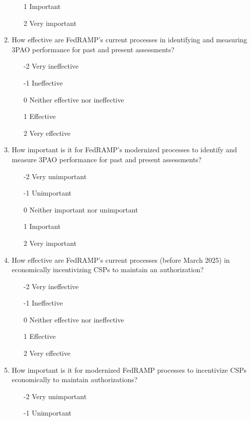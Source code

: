 \documentclass{jdf}
\begin{document}
\begin{enumerate}
\begin{enumerate}
        \item  [1] Important
        \item  [2] Very important
    \end{enumerate}
    \item How effective are FedRAMP's current processes in identifying and measuring 3PAO performance for past and present assessments?
    \begin{enumerate}
        \item [-2] Very ineffective
        \item [-1] Ineffective
        \item  [0] Neither effective nor ineffective
        \item  [1] Effective 
        \item  [2] Very effective
    \end{enumerate}
    \item How important is it for FedRAMP's modernized processes to identify and measure 3PAO performance for past and present assessments?
    \begin{enumerate}
        \item [-2] Very unimportant
        \item [-1] Unimportant
        \item  [0] Neither important nor unimportant
        \item  [1] Important
        \item  [2] Very important
    \end{enumerate}
    \item How effective are FedRAMP's current processes (before March 2025) in economically incentivizing CSPs to maintain an authorization?
    \begin{enumerate}
        \item [-2] Very ineffective
        \item [-1] Ineffective
        \item  [0] Neither effective nor ineffective
        \item  [1] Effective 
        \item  [2] Very effective
    \end{enumerate}
    \item How important is it for modernized FedRAMP processes to incentivize CSPs economically to maintain authorizations?
    \begin{enumerate}
        \item [-2] Very unimportant
        \item [-1] Unimportant

\end{enumerate}
\end{enumerate}
\end{document}
